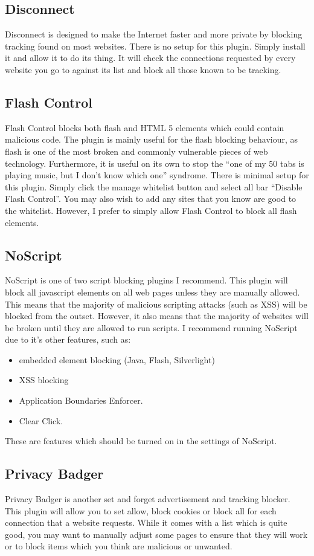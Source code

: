 \documentclass[a4paper,11pt]{report}
\begin{document}
		\subsection{Disconnect}
			Disconnect is designed to make the Internet faster and more private by blocking tracking found on most websites. 
			There is no setup for this plugin. Simply install it and allow it to do its thing. 
			It will check the connections requested by every website you go to against its list and block all those known to be tracking. 
		\subsection{Flash Control}
			Flash Control blocks both flash and HTML 5 elements which could contain malicious code. 
			The plugin is mainly useful for the flash blocking behaviour, as flash is one of the most broken and commonly vulnerable pieces of web technology. 
			Furthermore, it is useful on its own to stop the ``one of my 50 tabs is playing music, but I don't know which one'' syndrome. 
			There is minimal setup for this plugin. Simply click the manage whitelist button and select all bar ``Disable Flash Control''. 
			You may also wish to add any sites that you know are good to the whitelist. 
			However, I prefer to simply allow Flash Control to block all flash elements. 
		\subsection{NoScript}
			NoScript is one of two script blocking plugins I recommend. 
			This plugin will block all javascript elements on all web pages unless they are manually allowed. 
			This means that the majority of malicious scripting attacks (such as XSS) will be blocked from the outset. 
			However, it also means that the majority of websites will be broken until they are allowed to run scripts. 
			I recommend running NoScript due to it's other features, such as:
			\begin{itemize}
				\item embedded element blocking (Java, Flash, Silverlight) 
				\item XSS blocking
				\item Application Boundaries Enforcer. 
				\item Clear Click. 
			\end{itemize}
			These are features which should be turned on in the settings of NoScript. 
		\subsection{Privacy Badger}
			Privacy Badger is another set and forget advertisement and tracking blocker. 
			This plugin will allow you to set allow, block cookies or block all for each connection that a website requests. 
			While it comes with a list which is quite good, you may want to manually adjust some pages to ensure that they will work or to block items which you think are malicious or unwanted. 
\end{document}
